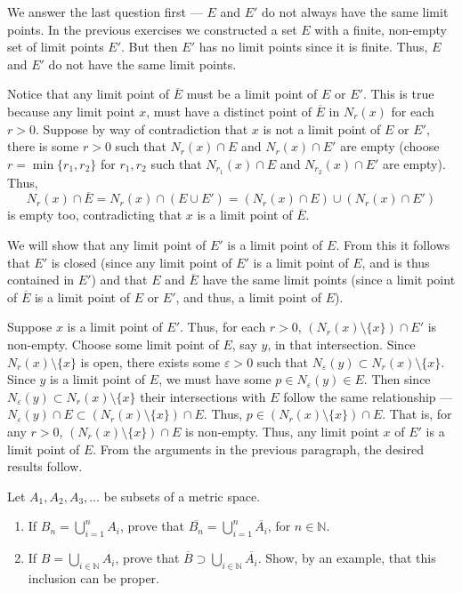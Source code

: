 \documentclass[12 pt, letterpaper]{hmcpset}
\begin{document}
\begin{solution}
	We answer the last question first --- $E$ and $E'$ do not always have the same limit points. In the previous exercises we constructed a set $E$ with a finite, non-empty set of limit points $E'$. But then $E'$ has no limit points since it is finite. Thus, $E$ and $E'$ do not have the same limit points.

	Notice that any limit point of $\overline{E}$ must be a limit point of $E$ or $E'$. This is true because any limit point $x$, must have a distinct point of $\overline{E}$ in $N_{r}(x)$ for each $r > 0$. Suppose by way of contradiction that $x$ is not a limit point of $E$ or $E'$, there is some $r > 0$ such that $N_{r}(x) \cap E$ and $N_{r}(x) \cap E'$ are empty (choose $r = \min \{ r_{1}, r_{2} \}$ for $r_{1}, r_{2}$ such that $N_{r_{1}}(x) \cap E$ and $N_{r_{2}}(x) \cap E'$ are empty). Thus,
	\[
		N_{r}(x) \cap \overline{E} = N_{r}(x) \cap (E \cup E') = (N_{r}(x) \cap E) \cup (N_{r}(x) \cap E')
	\]
	is empty too, contradicting that $x$ is a limit point of $\overline{E}$.

	We will show that any limit point of $E'$ is a limit point of $E$. From this it follows that $E'$ is closed (since any limit point of $E'$ is a limit point of $E$, and is thus contained in $E'$) and that $E$ and $\overline{E}$ have the same limit points (since a limit point of $\overline{E}$ is a limit point of $E$ or $E'$, and thus, a limit point of $E$).

	Suppose $x$ is a limit point of $E'$. Thus, for each $r > 0$, $(N_{r}(x) \setminus \{ x \}) \cap E'$ is non-empty. Choose some limit point of $E$, say $y$, in that intersection. Since $N_{r}(x) \setminus \{ x \}$ is open, there exists some $\varepsilon > 0$ such that $N_{\varepsilon}(y) \subset N_{r}(x) \setminus \{ x \}$. Since $y$ is a limit point of $E$, we must have some $p \in N_{\varepsilon}(y) \in E$. Then since $N_{\varepsilon}(y) \subset N_{r}(x) \setminus \{ x \}$ their intersections with $E$ follow the same relationship --- $N_{\varepsilon}(y) \cap E \subset (N_{r}(x) \setminus \{ x \}) \cap E$. Thus, $p \in (N_{r}(x) \setminus \{ x \}) \cap E$. That is, for any $r > 0$, $(N_{r}(x) \setminus \{ x \}) \cap E$ is non-empty. Thus, any limit point $x$ of $E'$ is a limit point of $E$. From the arguments in the previous paragraph, the desired results follow.
\end{solution}

\pagebreak

\begin{problem}
	Let $A_{1}, A_{2}, A_{3}, \dots$ be subsets of a metric space.
	\begin{enumerate}
		\item If $B_{n} = \bigcup_{i = 1}^{n} A_{i}$, prove that $\overline{B_{n}} = \bigcup_{i = 1}^{n} \overline{A_{i}}$, for $n \in \mathbb{N}$.
		\item If $B = \bigcup_{i \in \mathbb{N}} A_{i}$, prove that $\overline{B} \supset \bigcup_{i \in \mathbb{N}} \overline{A_{i}}$. Show, by an example, that this inclusion can be proper.
	\end{enumerate}
\end{problem}
\end{document}
